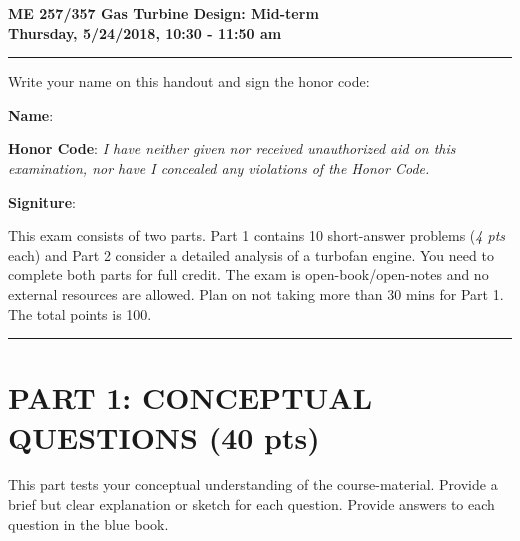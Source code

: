 \documentclass[11pt]{article}
\begin{document}
\begin{center}
{\Large\bf ME 257/357 Gas Turbine Design: Mid-term\\
       Thursday, 5/24/2018, 10:30 - 11:50 am}
\end{center}

\hrule
\vspace{2mm}
\noindent Write your name on this handout and sign the honor code:

\vspace{6mm}
\noindent \textbf{Name}: \dotfill %
\vspace{2mm}

\noindent \textbf{Honor Code}: \emph{I have neither given nor received unauthorized aid on this examination, nor have I concealed any violations of the Honor Code.}

\vspace{6mm}
\noindent \textbf{Signiture}: \dotfill %

\vspace{2mm}
\noindent This exam consists of two parts. Part 1 contains 10 short-answer problems (\emph{4 pts} each) and Part 2 consider a detailed analysis of a turbofan engine. You need to complete both parts for full credit. The exam is open-book/open-notes and no external resources are allowed. Plan on not taking more than 30 mins for Part 1. The total points is 100.

\vspace{2mm}
\hrule

\vspace{2mm}

\section*{\textbf{PART 1:} CONCEPTUAL QUESTIONS (40 pts)} %
\label{sec:_textbf_part_1_short_answers}
This part tests your conceptual understanding of the course-material. Provide a brief but clear explanation or sketch for each question. Provide answers to each question in the blue book.
\end{document}
